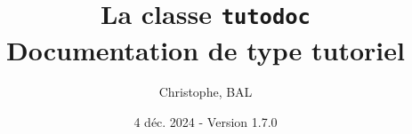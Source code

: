 \newcommand{\FTfile}{}
\def\FTfile(#1,#2){%
  node(tmp){}
  (#1|-tmp)++(0.6em,0)
  node(tmp)[anchor=west,black]{\texttt{#2}}
  (#1)|-(tmp.west)
  ++(0,-1.2em)
}

\newcommand{\FTroot}{}
\def\FTroot{tmp.west}

\newcommand\contribtranslatedirtree{
  \begin{tikzpicture}%
    \draw[color=black, thick]
      \FTdirO(\FTroot,root,translate){
        \FTdirC(root,changes,changes){
        }
        \FTdirO(root,en,en) {
          \FTdirC(en,api,api) {
          }
          \FTdirC(en,doc,doc) {
          }
        }
        \FTdirC(root,fr,fr){
        }
        \FTdirC(root,status,status){
          \FTdirO(status,en,en) {
            \FTfile(en,api.yaml)
            \FTfile(en,manual.yaml)
          }
          \FTdirC(status,fr,fr){
          }
        }
        \FTfile(root,README.md)
        \FTfile(root,LICENSE.txt)
      };
  \end{tikzpicture}
}





\title{La classe \texttt{tutodoc} \\ Documentation de type tutoriel}
\author{Christophe, BAL}
\date{4 déc. 2024 - Version 1.7.0}

\maketitle

